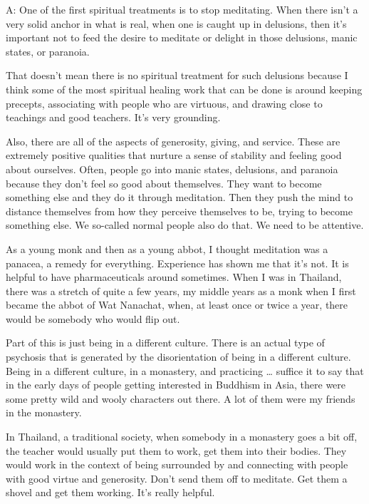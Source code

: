 \vspace{\the\qaskip}
A: One of the first spiritual treatments is to stop meditating. When
there isn’t a very solid anchor in what is real, when one is caught up
in delusions, then it’s important not to feed the desire to meditate or
delight in those delusions, manic states, or paranoia.

That doesn’t mean there is no spiritual treatment for such delusions
because I think some of the most spiritual healing work that can be done
is around keeping precepts, associating with people who are virtuous,
and drawing close to teachings and good teachers. It’s very grounding.

Also, there are all of the aspects of generosity, giving, and service.
These are extremely positive qualities that nurture a sense of stability
and feeling good about ourselves. Often, people go into manic states,
delusions, and paranoia because they don’t feel so good about
themselves. They want to become something else and they do it through
meditation. Then they push the mind to distance themselves from how they
perceive themselves to be, trying to become something else. We so-called
normal people also do that. We need to be attentive.

As a young monk and then as a young abbot, I thought meditation was a
panacea, a remedy for everything. Experience has shown me that it’s not.
It is helpful to have pharmaceuticals around sometimes. When I was in
Thailand, there was a stretch of quite a few years, my middle years as a
monk when I first became the abbot of Wat Nanachat, when, at least once
or twice a year, there would be somebody who would flip out.

Part of this is just being in a different culture. There is an actual
type of psychosis that is generated by the disorientation of being in a
different culture. Being in a different culture, in a monastery, and
practicing \ldots{} suffice it to say that in the early days of people
getting interested in Buddhism in Asia, there were some pretty wild and
wooly characters out there. A lot of them were my friends in the
monastery.

In Thailand, a traditional society, when somebody in a monastery goes a
bit off, the teacher would usually put them to work, get them into their
bodies. They would work in the context of being surrounded by and
connecting with people with good virtue and generosity. Don’t send them
off to meditate. Get them a shovel and get them working. It’s really
helpful.

